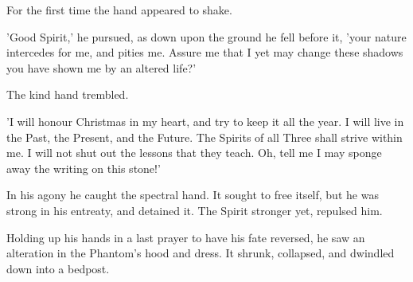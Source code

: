 For the first time the hand appeared to shake.

'Good Spirit,' he pursued, as down upon the ground he fell before it,
'your nature intercedes for me, and pities me. Assure me that I yet may
change these shadows you have shown me by an altered life?'

The kind hand trembled.

'I will honour Christmas in my heart, and try to keep it all the year. I
will live in the Past, the Present, and the Future. The Spirits of all
Three shall strive within me. I will not shut out the lessons that they
teach. Oh, tell me I may sponge away the writing on this stone!'

In his agony he caught the spectral hand. It sought to free itself, but
he was strong in his entreaty, and detained it. The Spirit stronger yet,
repulsed him.

Holding up his hands in a last prayer to have his fate reversed, he saw
an alteration in the Phantom's hood and dress. It shrunk, collapsed, and
dwindled down into a bedpost.


